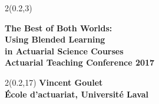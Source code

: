 \begingroup

\textblockorigin{0mm}{0mm}
\begin{frame}[plain]
  \begin{textblock*}{2\TPHorizModule}(0.2\TPHorizModule,3\TPVertModule)
    \raggedright%
    \bfseries
    \fontsize{20}{20}\selectfont
    The Best of Both Worlds: \\
    Using Blended Learning \\
    in Actuarial Science Courses \\
    \mdseries
    \fontsize{14}{18}\selectfont
    Actuarial Teaching Conference 2017
  \end{textblock*}

  \begin{textblock*}{2\TPHorizModule}(0.2\TPHorizModule,17\TPVertModule)
    \fontsize{10}{11}\selectfont
    \bfseries
    Vincent Goulet \\
    \fontsize{9}{11}\selectfont
    \mdseries
    École d'actuariat, Université Laval
  \end{textblock*}
\end{frame}
\endgroup

